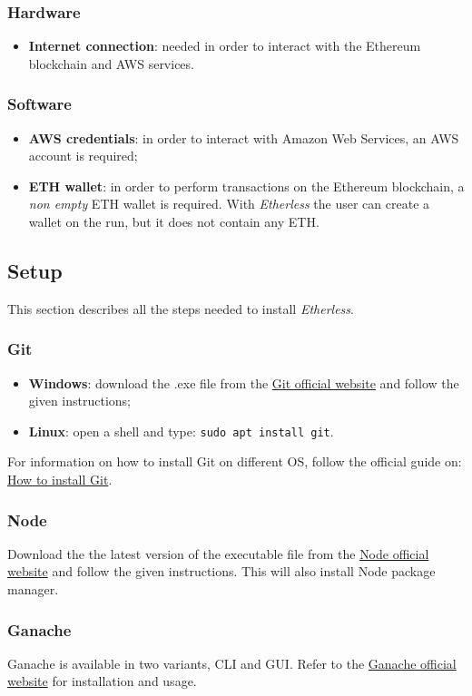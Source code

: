 \subsubsection{Hardware}
\begin{itemize}
	\item \textbf{Internet connection}: needed in order to interact with the Ethereum blockchain and AWS services.
\end{itemize}
\subsubsection{Software}
\begin{itemize}
	\item \textbf{AWS credentials}: in order to interact with Amazon Web Services, an AWS account is required;
	\item \textbf{ETH wallet}: in order to perform transactions on the Ethereum blockchain, a \textit{non empty} ETH wallet is required. With \textit{Etherless} the user can create a wallet on the run, but it does not contain any ETH.
\end{itemize}
\subsection{Setup}
This section describes all the steps needed to install \textit{Etherless}.
\subsubsection{Git}
\begin{itemize}
	\item \textbf{Windows}: download the .exe file from the \href{https://git-scm.com/download/win}{Git official website} and follow the given instructions;
	\item \textbf{Linux}: open a shell and type: \texttt{sudo apt install git}.
\end{itemize}
	For information on how to install Git on different OS, follow the official guide on: \href{https://git-scm.com/book/en/v2/Getting-Started-Installing-Git}{How to install Git}.
\subsubsection{Node}
	Download the the latest version of the executable file from the \href{https://nodejs.org/it/download/}{Node official website} and follow the given instructions. This will also install Node package manager.
\subsubsection{Ganache}
	Ganache is available in two variants, CLI and GUI. Refer to the \href{https://www.trufflesuite.com/docs/ganache/quickstart}{Ganache official website} for installation and usage.
